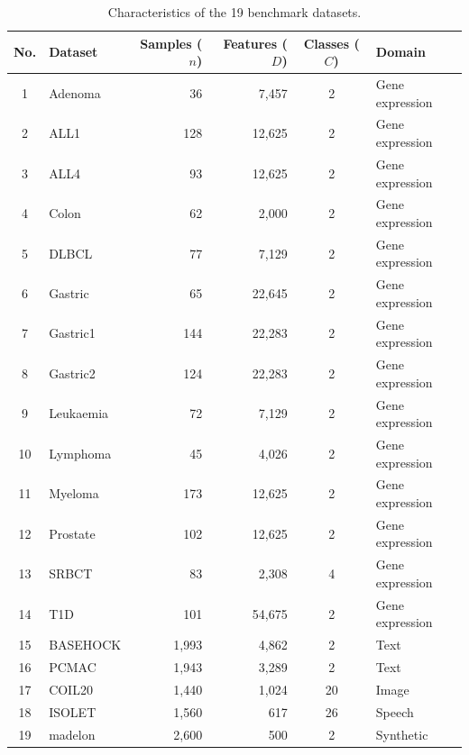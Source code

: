 \begin{table}[!htb]
\centering
\ktablecaption
\small
\caption{Characteristics of the 19 benchmark datasets.}
\label{T2}
\renewcommand{\arraystretch}{1.15}
\setlength{\tabcolsep}{3pt}
\begin{tabular*}{\linewidth}{@{\extracolsep{\fill}}clrrc l@{}}
\toprule
No. & Dataset & Samples ($n$) & Features ($D$) & Classes ($C$) & Domain \\
\midrule
1  & Adenoma    &   36 &  7{,}457  &  2 & Gene expression \\
2  & ALL1       &  128 & 12{,}625  &  2 & Gene expression \\
3  & ALL4       &   93 & 12{,}625  &  2 & Gene expression \\
4  & Colon      &   62 &  2{,}000  &  2 & Gene expression \\
5  & DLBCL      &   77 &  7{,}129  &  2 & Gene expression \\
6  & Gastric    &   65 & 22{,}645  &  2 & Gene expression \\
7  & Gastric1   &  144 & 22{,}283  &  2 & Gene expression \\
8  & Gastric2   &  124 & 22{,}283  &  2 & Gene expression \\
9  & Leukaemia  &   72 &  7{,}129  &  2 & Gene expression \\
10 & Lymphoma   &   45 &  4{,}026  &  2 & Gene expression \\
11 & Myeloma    &  173 & 12{,}625  &  2 & Gene expression \\
12 & Prostate   &  102 & 12{,}625  &  2 & Gene expression \\
13 & SRBCT      &   83 &  2{,}308  &  4 & Gene expression \\
14 & T1D        &  101 & 54{,}675  &  2 & Gene expression \\
\midrule
15 & BASEHOCK   & 1{,}993 & 4{,}862  &  2 & Text \\
16 & PCMAC      & 1{,}943 & 3{,}289  &  2 & Text \\
\midrule
17 & COIL20     & 1{,}440 & 1{,}024  & 20 & Image \\
\midrule
18 & ISOLET     & 1{,}560 &   617    & 26 & Speech \\
\midrule
19 & madelon    & 2{,}600 &   500    &  2 & Synthetic \\
\bottomrule
\end{tabular*}
\end{table}